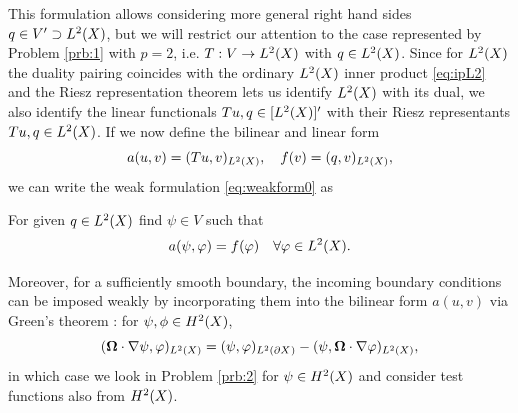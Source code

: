 This formulation
allows considering more general right hand sides \linebreak\mbox{$q \in V' \supset \Lp[2](X)$}, but we will restrict our
attention to the case represented by Problem \ref{prb:1} with $p = 2$, i.e. $T : V \to \Lp[2](X)$ with $q \in
\Lp[2](X)$.  Since for $\Lp[2](X)$ the duality pairing coincides with the ordinary $\Lp[2](X)$ inner product
\eqref{eq:ipL2} and the Riesz representation theorem lets us identify $\Lp[2](X)$ with its dual, we also identify the
linear functionals $Tu,q \in [\Lp[2](X)]'$ with their Riesz representants $Tu,q \in \Lp[2](X)$. If we now define
the bilinear and linear form $$ a(u,v) = \ip{\Lp[2](X)}{Tu,v}, \quad f(v) = \ip{\Lp[2](X)}{q,v}, $$
we can write the weak formulation \eqref{eq:weakform0} as
\begin{problem}\label{prb:2}
For given $q\in \Lp[2](X)$ find $\psi \in V$ such that
$$
	a(\psi, \varphi) = f(\varphi) \quad \forall \varphi\in\Lp[2](X).
$$
\end{problem}
Moreover, for a sufficiently smooth boundary, the incoming boundary conditions can be imposed weakly by incorporating
them into the bilinear form $a(u,v)$ via Green's theorem \cite[Thm. 2.24]{Agoshkov}:
for $\psi,\phi\in \Hp[2](X)$,
$$\ip{\Lp[2](X)}{\bomega\cdot\nabla\psi, \varphi} = \ip{\Lp[2](\pX)}{\psi, \varphi} -
\ip{\Lp[2](X)}{\psi, \bomega\cdot\nabla\varphi},
$$
in which case we look in Problem \ref{prb:2} for $\psi \in \Hp[2](X)$ and consider test functions also from $\Hp[2](X)$.

